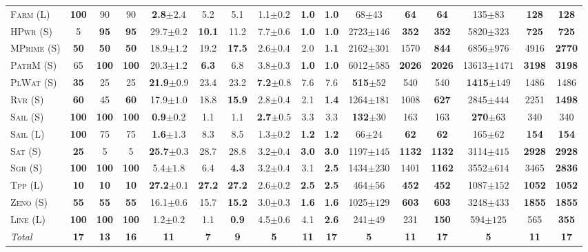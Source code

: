 \documentclass[11pt,landscape]{article}
\begin{document}
\begin{table*}[tb]
{\begin{tabular}{|l||ccc||ccc||ccc||ccc||ccc||}
\textsc{Farm} (L)&\textbf{100}&90&90&\textbf{2.8}$\pm 2.4$&5.2&5.1&1.1$\pm 0.2$&\textbf{1.0}&\textbf{1.0}&68$\pm 43$&\textbf{64}&\textbf{64}&135$\pm 83$&\textbf{128}&\textbf{128}\\
\textsc{HPwr} (S)&5&\textbf{95}&\textbf{95}&29.7$\pm 0.2$&\textbf{10.1}&11.2&7.7$\pm 0.6$&\textbf{1.0}&\textbf{1.0}&2723$\pm 146$&\textbf{352}&\textbf{352}&5820$\pm 323$&\textbf{725}&\textbf{725}\\
\textsc{MPrime} (S)&\textbf{50}&\textbf{50}&\textbf{50}&18.9$\pm 1.2$&19.2&\textbf{17.5}&2.6$\pm 0.4$&2.0&\textbf{1.1}&2162$\pm 301$&1570&\textbf{844}&6856$\pm 976$&4916&\textbf{2770}\\
\textsc{PathM} (S)&65&\textbf{100}&\textbf{100}&20.3$\pm 1.2$&\textbf{6.3}&6.8&3.8$\pm 0.3$&\textbf{1.0}&\textbf{1.0}&6012$\pm 585$&\textbf{2026}&\textbf{2026}&13613$\pm 1471$&\textbf{3198}&\textbf{3198}\\
\textsc{PlWat} (S)&\textbf{35}&25&25&\textbf{21.9}$\pm 0.9$&23.4&23.2&\textbf{7.2}$\pm 0.8$&7.6&7.6&\textbf{515}$\pm 52$&540&540&\textbf{1415}$\pm 149$&1486&1486\\
\textsc{Rvr} (S)&\textbf{60}&45&\textbf{60}&17.9$\pm 1.0$&18.8&\textbf{15.9}&2.8$\pm 0.4$&2.1&\textbf{1.4}&1264$\pm 181$&1008&\textbf{627}&2845$\pm 444$&2251&\textbf{1498}\\
\textsc{Sail} (S)&\textbf{100}&\textbf{100}&\textbf{100}&\textbf{0.9}$\pm 0.2$&1.1&1.1&\textbf{2.7}$\pm 0.5$&3.3&3.3&\textbf{132}$\pm 30$&163&163&\textbf{270}$\pm 63$&340&340\\
\textsc{Sail} (L)&\textbf{100}&75&75&\textbf{1.6}$\pm 1.3$&8.3&8.5&1.3$\pm 0.2$&\textbf{1.2}&\textbf{1.2}&66$\pm 24$&\textbf{62}&\textbf{62}&165$\pm 62$&\textbf{154}&\textbf{154}\\
\textsc{Sat} (S)&\textbf{25}&5&5&\textbf{25.7}$\pm 0.3$&28.7&28.8&3.2$\pm 0.4$&\textbf{3.0}&\textbf{3.0}&1197$\pm 145$&\textbf{1132}&\textbf{1132}&3114$\pm 415$&\textbf{2928}&\textbf{2928}\\
\textsc{Sgr} (S)&\textbf{100}&\textbf{100}&\textbf{100}&5.4$\pm 1.8$&6.4&\textbf{4.3}&3.2$\pm 0.4$&3.1&\textbf{2.5}&1434$\pm 230$&1401&\textbf{1162}&3552$\pm 614$&3465&\textbf{2836}\\
\textsc{Tpp} (L)&\textbf{10}&\textbf{10}&\textbf{10}&\textbf{27.2}$\pm 0.1$&\textbf{27.2}&\textbf{27.2}&2.6$\pm 0.2$&\textbf{2.5}&\textbf{2.5}&464$\pm 56$&\textbf{452}&\textbf{452}&1087$\pm 152$&\textbf{1052}&\textbf{1052}\\
\textsc{Zeno} (S)&\textbf{55}&\textbf{55}&\textbf{55}&16.1$\pm 0.6$&15.7&\textbf{15.2}&3.0$\pm 0.3$&\textbf{1.6}&\textbf{1.6}&1025$\pm 129$&\textbf{603}&\textbf{603}&3248$\pm 433$&\textbf{1855}&\textbf{1855}\\
\textsc{Line} (L)&\textbf{100}&\textbf{100}&\textbf{100}&1.2$\pm 0.2$&1.1&\textbf{0.9}&4.5$\pm 0.6$&4.1&\textbf{2.6}&241$\pm 49$&231&\textbf{150}&594$\pm 125$&565&\textbf{355}
\\\hline
\textit{Total}&\textbf{17}&\textbf{13}&\textbf{16}&\textbf{11}&\textbf{7}&\textbf{9}&\textbf{5}&\textbf{11}&\textbf{17}&\textbf{5}&\textbf{11}&\textbf{17}&\textbf{5}&\textbf{11}&\textbf{17}\\\hline


\end{tabular}}
\end{table*}
\end{document}
